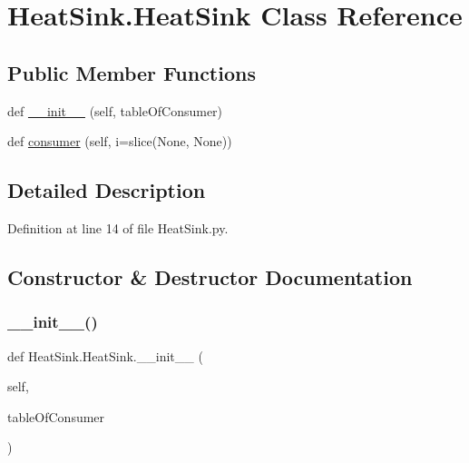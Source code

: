 \hypertarget{class_heat_sink_1_1_heat_sink}{}\section{Heat\+Sink.\+Heat\+Sink Class Reference}
\label{class_heat_sink_1_1_heat_sink}
\subsection*{Public Member Functions}
\begin{DoxyCompactItemize}
\item 
def \hyperlink{class_heat_sink_1_1_heat_sink_a1bd8a32977fa197c106013805bdedad7}{\+\_\+\+\_\+init\+\_\+\+\_\+} (self, table\+Of\+Consumer)
\item 
def \hyperlink{class_heat_sink_1_1_heat_sink_a10c8205c614c016c724f51c350b6ec18}{consumer} (self, i=slice(None, None))
\end{DoxyCompactItemize}


\subsection{Detailed Description}


Definition at line 14 of file Heat\+Sink.\+py.



\subsection{Constructor \& Destructor Documentation}
\mbox{\label{class_heat_sink_1_1_heat_sink_a1bd8a32977fa197c106013805bdedad7}} 
\subsubsection{\texorpdfstring{\+\_\+\+\_\+init\+\_\+\+\_\+()}{\_\_init\_\_()}}
{\footnotesize\ttfamily def Heat\+Sink.\+Heat\+Sink.\+\_\+\+\_\+init\+\_\+\+\_\+ (\begin{DoxyParamCaption}\item[{}]{self,  }\item[{}]{table\+Of\+Consumer }\end{DoxyParamCaption})}



